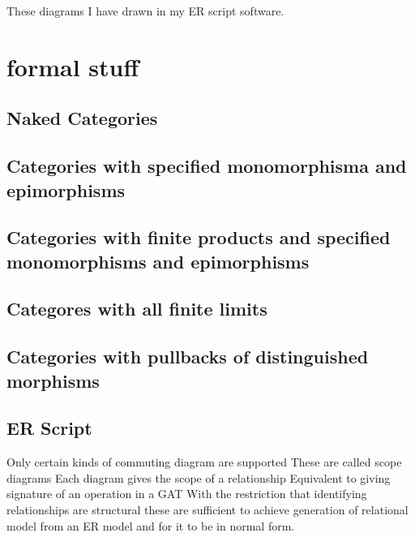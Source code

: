 \documentclass[10pt,a4paper]{article}
\theoremstyle{remark}
\begin{document}
These diagrams I have drawn in my ER script software.

\section{formal stuff}
\subsection{Naked Categories}
\subsection{Categories with specified monomorphisma and epimorphisms}
\subsection{Categories with finite products and specified monomorphisms and epimorphisms}
\subsection{Categores with all finite limits}
\subsection{Categories with pullbacks of distinguished morphisms}
\subsection{ER Script}
Only certain kinds of commuting diagram are supported
These are called scope diagrams
Each diagram gives the scope of a relationship
Equivalent to giving signature of an operation in a GAT
With the restriction that identifying relationships are structural these are sufficient to achieve generation of relational model from an ER model and for it to be in normal form.
\end{document}
